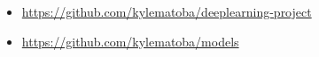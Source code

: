 \documentclass[10pt,twocolumn,letterpaper]{article}
\begin{document}
	\begin{itemize}
	\item \url{https://github.com/kylematoba/deeplearning-project}
	\item \url{https://github.com/kylematoba/models}
	\end{itemize}


\nocite{Torralba2008}
{\small


}
\end{document}
